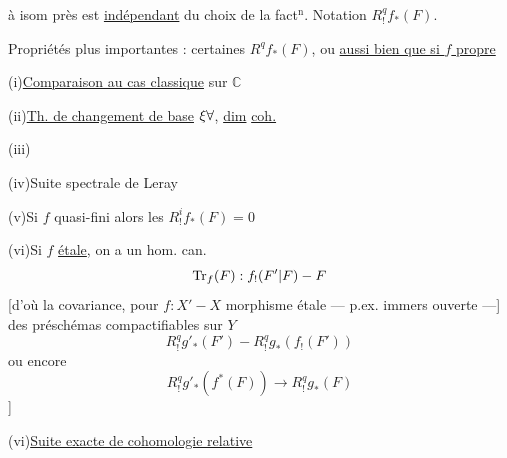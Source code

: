 
à isom près est \uline{indépendant} du
choix de la fact$^{\mathrm n}$. Notation $R^q_!f_*(F)$.

 Propriétés plus importantes : certaines
 $R^qf_*(F)$, ou \uline{aussi bien que si $f$ propre}

(i)\quad \uline{Comparaison au cas classique} sur $\mathbb C$

(ii)\quad \uline{Th. de changement de base} ${{\xi}}{\forall}$, \uline{dim} \uline{coh.}

(iii)\quad {}

(iv)\quad Suite spectrale de Leray

(v)\quad Si $f$ quasi-fini  alors les $R^i_!f_*(F)=0$

(vi)\quad Si $f$ \uline{étale}, on a un hom. can.
\[
\operatorname{Tr}_f(F):f_!({F'|F})\mathbin{-}F
\]
[d'où la covariance, pour $f:X'\mathbin{-}X$ morphisme
étale --- p.ex. immers ouverte ---] des
préschémas compactifiables sur $Y$
\[
R^q_!g'_*(F')\mathbin{-}R^q_!g_*(f_!(F'))
\]
ou encore
\[
R^q_!g'_*(f^*(F))\longrightarrow R^q_!g_*(F)
\]
]

(vi)\quad \uline{Suite exacte de cohomologie relative}

